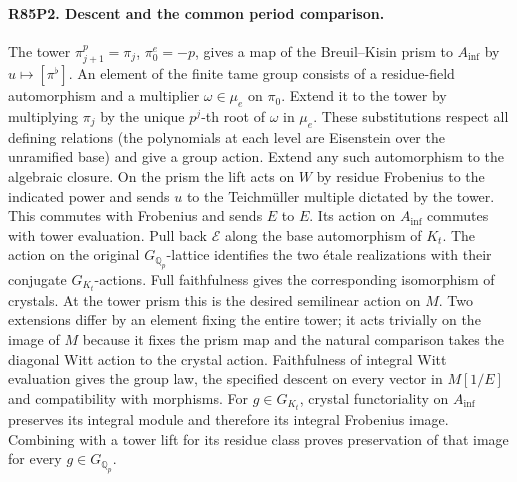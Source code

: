 \paragraph{R85P2. Descent and the common period comparison.}
The tower $\pi_{j+1}^p=\pi_j$, $\pi_0^e=-p$, gives a map of
the Breuil--Kisin prism to $A_{\inf}$ by $u\mapsto[\pi^\flat]$.
An element of the finite tame group consists of a residue-field
automorphism and a multiplier $\omega\in\mu_e$ on $\pi_0$.
Extend it to the tower by multiplying $\pi_j$ by the unique
$p^j$-th root of $\omega$ in $\mu_e$. These substitutions respect
all defining relations (the polynomials at each level are
Eisenstein over the unramified base) and give a group action.
Extend any such automorphism to the algebraic closure. On the
prism the lift acts on $W$ by residue Frobenius to the indicated
power and sends $u$ to the Teichm\"uller multiple dictated by the
tower. This commutes with Frobenius and sends $E$ to $E$.
Its action on $A_{\inf}$ commutes with tower evaluation. Pull back
$\mathscr E$ along the base automorphism of $K_t$. The action
on the original $G_{\mathbb Q_p}$-lattice identifies the two
\'{e}tale realizations with their conjugate $G_{K_t}$-actions.
Full faithfulness gives the corresponding isomorphism of crystals.
At the tower prism this is the desired semilinear action on $M$.
Two extensions differ by an element fixing the entire tower; it
acts trivially on the image of $M$ because it fixes the prism map
and the natural comparison takes the diagonal Witt action to the
crystal action. Faithfulness of integral Witt evaluation gives the
group law, the specified descent on every vector in $M[1/E]$ and
compatibility with morphisms. For $g\in G_{K_t}$, crystal
functoriality on $A_{\inf}$ preserves its integral module and
therefore its integral Frobenius image. Combining with a tower
lift for its residue class proves preservation of that image for
every $g\in G_{\mathbb Q_p}$.

